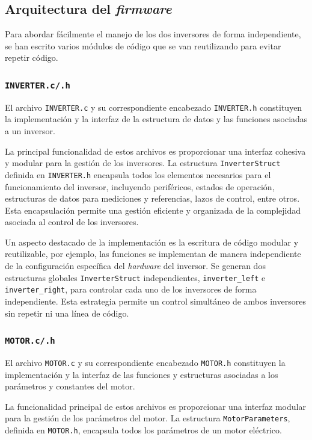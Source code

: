 \subsection{Arquitectura del \textit{firmware}}

Para abordar fácilmente el manejo de los dos inversores de forma independiente, se han escrito varios módulos de código que se van reutilizando para evitar repetir código.

\subsubsection{\texttt{INVERTER.c/.h}}

El archivo \texttt{INVERTER.c} y su correspondiente encabezado \texttt{INVERTER.h} constituyen la implementación y la interfaz de la estructura de datos y las funciones asociadas a un inversor.

La principal funcionalidad de estos archivos es proporcionar una interfaz cohesiva y modular para la gestión de los inversores. La estructura \texttt{InverterStruct} definida en \texttt{INVERTER.h} encapsula todos los elementos necesarios para el funcionamiento del inversor, incluyendo periféricos, estados de operación, estructuras de datos para mediciones y referencias, lazos de control, entre otros. Esta encapsulación permite una gestión eficiente y organizada de la complejidad asociada al control de los inversores.

Un aspecto destacado de la implementación es la escritura de código modular y reutilizable, por ejemplo, las funciones se implementan de manera independiente de la configuración específica del \textit{hardware} del inversor. Se generan dos estructuras globales \texttt{InverterStruct} independientes, \texttt{inverter\_left} e \texttt{inverter\_right}, para controlar cada uno de los inversores de forma independiente. Esta estrategia permite un control simultáneo de ambos inversores sin repetir ni una línea de código.

\subsubsection{\texttt{MOTOR.c/.h}}

El archivo \texttt{MOTOR.c} y su correspondiente encabezado \texttt{MOTOR.h} constituyen la implementación y la interfaz de las funciones y estructuras asociadas a los parámetros y constantes del motor.

La funcionalidad principal de estos archivos es proporcionar una interfaz modular para la gestión de los parámetros del motor. La estructura \texttt{MotorParameters}, definida en \texttt{MOTOR.h}, encapsula todos los parámetros de un motor eléctrico.

